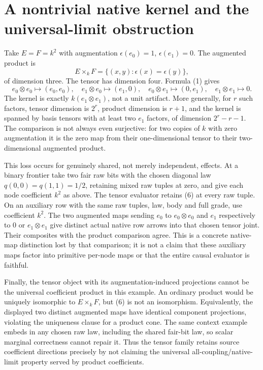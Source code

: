 \documentclass[11pt]{article}
\begin{document}
\section{A nontrivial native kernel and the universal-limit obstruction}
Take $E=F=k^2$ with augmentation $\epsilon(e_0)=1$, $\epsilon(e_1)=0$. The augmented product is
\[
 E\times_kF=\{(x,y):\epsilon(x)=\epsilon(y)\},
\]
of dimension three. The tensor has dimension four. Formula (1) gives
\[
 e_0\otimes e_0\mapsto(e_0,e_0),\quad
 e_1\otimes e_0\mapsto(e_1,0),\quad
 e_0\otimes e_1\mapsto(0,e_1),\quad
 e_1\otimes e_1\mapsto0.                                  \tag{6}
\]
The kernel is exactly $k(e_1\otimes e_1)$, not a unit artifact. More generally, for $r$ such factors, tensor dimension is $2^r$, product dimension is $r+1$, and the kernel is spanned by basis tensors with at least two $e_1$ factors, of dimension $2^r-r-1$. The comparison is not always even surjective: for two copies of $k$ with zero augmentation it is the zero map from their one-dimensional tensor to their two-dimensional augmented product.

This loss occurs for genuinely shared, not merely independent, effects. At a binary frontier take two fair raw bits with the chosen diagonal law $q(0,0)=q(1,1)=1/2$, retaining mixed raw tuples at zero, and give each node coefficient $k^2$ as above. The tensor evaluator retains (6) at every raw tuple. On an auxiliary row with the same raw tuples, law, body and full grade, use coefficient $k^2$. The two augmented maps sending $e_0$ to $e_0\otimes e_0$ and $e_1$ respectively to $0$ or $e_1\otimes e_1$ give distinct actual native row arrows into that chosen tensor joint. Their composites with the product comparison agree. This is a concrete native-map distinction lost by that comparison; it is not a claim that these auxiliary maps factor into primitive per-node maps or that the entire causal evaluator is faithful.

Finally, the tensor object with its augmentation-induced projections cannot be the universal coefficient product in this example. An ordinary product would be uniquely isomorphic to $E\times_kF$, but (6) is not an isomorphism. Equivalently, the displayed two distinct augmented maps have identical component projections, violating the uniqueness clause for a product cone. The same context example embeds in any chosen raw law, including the shared fair-bit law, so scalar marginal correctness cannot repair it. Thus the tensor family retains source coefficient directions precisely by not claiming the universal all-coupling/native-limit property served by product coefficients.
\end{document}

